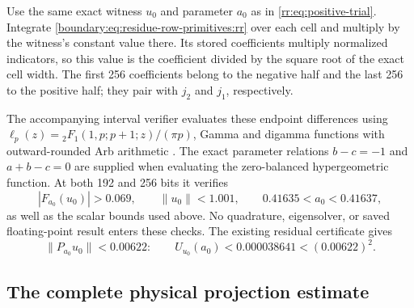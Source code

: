 Use the same exact witness $u_0$ and parameter $a_0$ as in
\eqref{rr:eq:positive-trial}.
Integrate \eqref{boundary:eq:residue-row-primitives:rr} over each
cell and multiply by the witness's constant value there.  Its stored
coefficients multiply normalized indicators, so this value is the
coefficient divided by the square root of the exact cell width.
The first 256 coefficients belong to the negative half and the last
256 to the positive half; they pair with $j_2$ and $j_1$, respectively.

The accompanying interval verifier evaluates these endpoint
differences using
$\ell_p(z)={}_2F_1(1,p;p+1;z)/(\pi p)$, Gamma and digamma functions
with outward-rounded Arb arithmetic \cite{Johansson2017}.
The exact parameter relations $b-c=-1$ and $a+b-c=0$ are supplied
when evaluating the zero-balanced hypergeometric function. At both
192 and 256 bits it verifies
\begin{equation}\label{boundary:eq:exact-residue-anchor:rr}
 |F_{a_0}(u_0)|>0.069,
 \qquad \|u_0\|<1.001,
 \qquad 0.41635<a_0<0.41637,
\end{equation}
as well as the scalar bounds used above.  No quadrature, eigensolver,
or saved floating-point result enters these checks.
The existing residual certificate gives
\begin{equation}\label{boundary:eq:frequency-residual-bound:rr}
 \|P_{a_0}u_0\|<0.00622:
 \qquad U_{u_0}(a_0)<0.000038641<(0.00622)^2.
\end{equation}

\subsection{The complete physical projection estimate}

